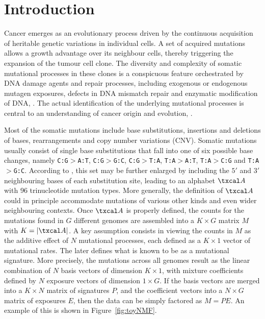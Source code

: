\documentclass{bioinfo}
\begin{document}
\section{Introduction}
Cancer emerges as an evolutionary process driven by the continuous
acquisition of heritable genetic variations in individual cells. A set
of acquired mutations allows a growth advantage over its neighbour
cells, thereby triggering the expansion of the tumour
cell clone. The diversity and complexity of somatic mutational
processes in these clones is a conspicuous feature orchestrated by DNA
damage agents and repair processes, including exogenous or endogenous
mutagen exposures, defects in DNA mismatch repair and enzymatic
modification of DNA, \cite{RG}. The actual identification of the
underlying mutational processes is central to an understanding of
cancer origin and evolution, \citealp{ANat, AS, HEN, NCell}.


Most of the somatic mutations include base substitutions, insertions
and deletions of bases, rearrangements and copy number variations 
(CNV). Somatic mutations usually consist of single base substitutions
that fall into one of six possible base changes, namely 
\texttt{C:G}$>$\texttt{A:T}, \texttt{C:G}$>$\texttt{G:C},
\texttt{C:G}$>$\texttt{T:A}, \texttt{T:A}$>$\texttt{A:T},
\texttt{T:A}$>$\texttt{C:G} and \texttt{T:A}$>$\texttt{G:C}. According
to \cite{A}, this set may be further enlarged by including the $5'$
and $3'$ neighbouring bases of each substitution site, leading to an 
alphabet $\txcal A$ with 96 trinucleotide mutation types. More
generally, the definition of $\txcal A$ could in principle accommodate
mutations of various other kinds 
and even wider neighbouring contexts. Once $\txcal A$
is properly defined, the counts for the mutations found in $G$
different genomes are assembled into a $K\times G$ matrix $M$ with $K
= |\txcal A|$. A key assumption consists in viewing the counts in $M$
as the additive effect of $N$ mutational processes, each defined as a
$K\times 1$ vector of mutational rates. The later defines what
is known to be as a mutational signature. More precisely, the
mutations across all genomes result as the linear combination of $N$
basis vectors of dimension $K\times 1$, with mixture coefficients
defined by $N$ exposure vectors of dimension $1 \times G$. If the
basis vectors are merged into a $K\times N$ matrix of signatures $P$,
and the coefficient vectors into a $N\times G$ matrix of exposures
$E$, then the data can be simply factored as $M=PE$. An example of
this is shown in Figure~\ref{fig:toyNMF}. 
\end{document}
